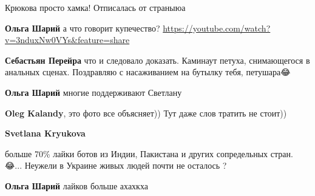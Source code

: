 \begin{itemize}
\begin{itemize}
Крюкова просто хамка! Отписалась от страныюа

 
\textbf{Ольга Шарий} а что говорит купечество? \url{https://youtube.com/watch?v=3nduxNw0VYs&feature=share}

 
\textbf{Себастьян Перейра} что и следовало доказать. Каминаут петуха, снимающегося в анальных сценах. Поздравляю с насаживанием на бутылку тебя, петушара😂

 
\textbf{Ольга Шарий} многие поддерживают Светлану

 
\textbf{Oleg Kalandy}, это фото все объясняет)) Тут даже слов тратить не стоит))

 
\textbf{Svetlana Kryukova} 

больше 70\% лайки ботов из Индии, Пакистана и других сопредельных стран. 😂... Неужели в Украине живых людей почти не осталось ?


 
\textbf{Ольга Шарий} лайков больше ахахкха


\end{itemize}
\end{itemize}
